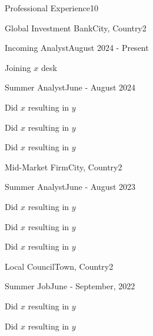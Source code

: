 \documentclass[10pt,a4paper]{CV}
\begin{document}
\begin{Section}{Professional Experience}{10}
    \begin{Institution}{Global Investment Bank}{City, Country}{2}
        \begin{Position}{Incoming Analyst}{August 2024 - Present}
            \item Joining $x$ desk
            \vspace{-4pt}
        \end{Position}
        \begin{Position}{Summer Analyst}{June - August 2024}
            \item Did $x$ resulting in $y$
            \item Did $x$ resulting in $y$
            \item Did $x$ resulting in $y$
        \end{Position}
    \end{Institution}
    
    \begin{Institution}{Mid-Market Firm}{City, Country}{2}
        \begin{Position}{Summer Analyst}{June - August 2023}
            \item Did $x$ resulting in $y$
            \item Did $x$ resulting in $y$
            \item Did $x$ resulting in $y$
        \end{Position}
    \end{Institution}
    
    \begin{Institution}{Local Council}{Town, Country}{2}
        \begin{Position}{Summer Job}{June - September, 2022}
            \item Did $x$ resulting in $y$
            \item Did $x$ resulting in $y$
        \end{Position}
    \end{Institution}
\end{Section}
\end{document}
